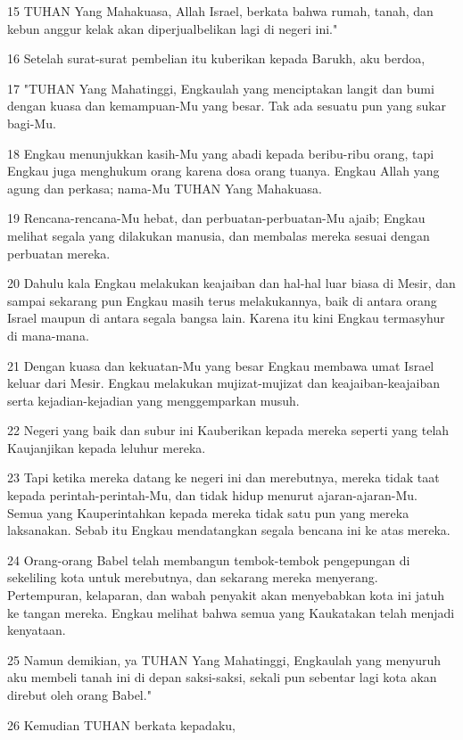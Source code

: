 \par 15 TUHAN Yang Mahakuasa, Allah Israel, berkata bahwa rumah, tanah, dan kebun anggur kelak akan diperjualbelikan lagi di negeri ini."
\par 16 Setelah surat-surat pembelian itu kuberikan kepada Barukh, aku berdoa,
\par 17 "TUHAN Yang Mahatinggi, Engkaulah yang menciptakan langit dan bumi dengan kuasa dan kemampuan-Mu yang besar. Tak ada sesuatu pun yang sukar bagi-Mu.
\par 18 Engkau menunjukkan kasih-Mu yang abadi kepada beribu-ribu orang, tapi Engkau juga menghukum orang karena dosa orang tuanya. Engkau Allah yang agung dan perkasa; nama-Mu TUHAN Yang Mahakuasa.
\par 19 Rencana-rencana-Mu hebat, dan perbuatan-perbuatan-Mu ajaib; Engkau melihat segala yang dilakukan manusia, dan membalas mereka sesuai dengan perbuatan mereka.
\par 20 Dahulu kala Engkau melakukan keajaiban dan hal-hal luar biasa di Mesir, dan sampai sekarang pun Engkau masih terus melakukannya, baik di antara orang Israel maupun di antara segala bangsa lain. Karena itu kini Engkau termasyhur di mana-mana.
\par 21 Dengan kuasa dan kekuatan-Mu yang besar Engkau membawa umat Israel keluar dari Mesir. Engkau melakukan mujizat-mujizat dan keajaiban-keajaiban serta kejadian-kejadian yang menggemparkan musuh.
\par 22 Negeri yang baik dan subur ini Kauberikan kepada mereka seperti yang telah Kaujanjikan kepada leluhur mereka.
\par 23 Tapi ketika mereka datang ke negeri ini dan merebutnya, mereka tidak taat kepada perintah-perintah-Mu, dan tidak hidup menurut ajaran-ajaran-Mu. Semua yang Kauperintahkan kepada mereka tidak satu pun yang mereka laksanakan. Sebab itu Engkau mendatangkan segala bencana ini ke atas mereka.
\par 24 Orang-orang Babel telah membangun tembok-tembok pengepungan di sekeliling kota untuk merebutnya, dan sekarang mereka menyerang. Pertempuran, kelaparan, dan wabah penyakit akan menyebabkan kota ini jatuh ke tangan mereka. Engkau melihat bahwa semua yang Kaukatakan telah menjadi kenyataan.
\par 25 Namun demikian, ya TUHAN Yang Mahatinggi, Engkaulah yang menyuruh aku membeli tanah ini di depan saksi-saksi, sekali pun sebentar lagi kota akan direbut oleh orang Babel."
\par 26 Kemudian TUHAN berkata kepadaku,
